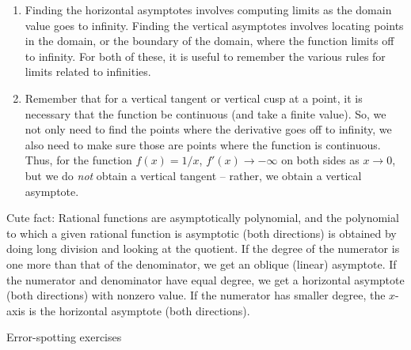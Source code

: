 \documentclass[10pt]{amsart}
\begin{document}
\begin{enumerate}
\item Finding the horizontal asymptotes involves computing limits as
  the domain value goes to infinity. Finding the vertical asymptotes
  involves locating points in the domain, or the boundary of the
  domain, where the function limits off to infinity. For both of
  these, it is useful to remember the various rules for limits related
  to infinities.
\item Remember that for a vertical tangent or vertical cusp at a
  point, it is necessary that the function be continuous (and take a
  finite value). So, we not only need to find the points where the
  derivative goes off to infinity, we also need to make sure those are
  points where the function is continuous. Thus, for the function
  $f(x) = 1/x$, $f'(x) \to - \infty$ on both sides as $x \to 0$, but
  we do {\em not} obtain a vertical tangent -- rather, we obtain a
  vertical asymptote.
\end{enumerate}

Cute fact: Rational functions are asymptotically polynomial, and the
polynomial to which a given rational function is asymptotic (both
directions) is obtained by doing long division and looking at the
quotient. If the degree of the numerator is one more than that of the
denominator, we get an oblique (linear) asymptote. If the numerator
and denominator have equal degree, we get a horizontal asymptote (both
directions) with nonzero value. If the numerator has smaller degree,
the $x$-axis is the horizontal asymptote (both directions).

Error-spotting exercises
\end{document}
